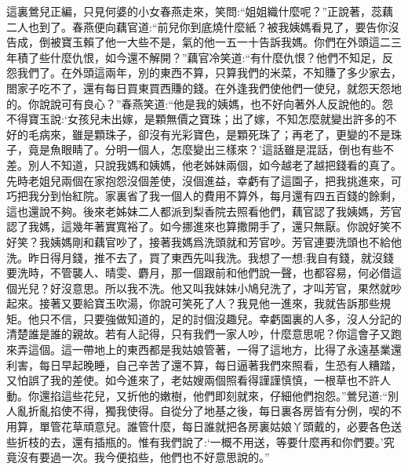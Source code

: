 \begin{parag}
    這裏鶯兒正編，只見何婆的小女春燕走來，笑問:“姐姐織什麼呢？”正說著，蕊藕二人也到了。春燕便向藕官道:“前兒你到底燒什麼紙？被我姨媽看見了，要告你沒告成，倒被寶玉賴了他一大些不是，氣的他一五一十告訴我媽。你們在外頭這二三年積了些什麼仇恨，如今還不解開？”藕官冷笑道:“有什麼仇恨？他們不知足，反怨我們了。在外頭這兩年，別的東西不算，只算我們的米菜，不知賺了多少家去，閤家子吃不了，還有每日買東買西賺的錢。在外逢我們使他們一使兒，就怨天怨地的。你說說可有良心？”春燕笑道:“他是我的姨媽，也不好向著外人反說他的。怨不得寶玉說:‘女孩兒未出嫁，是顆無價之寶珠；出了嫁，不知怎麼就變出許多的不好的毛病來，雖是顆珠子，卻沒有光彩寶色，是顆死珠了；再老了，更變的不是珠子，竟是魚眼睛了。分明一個人，怎麼變出三樣來？’這話雖是混話，倒也有些不差。別人不知道，只說我媽和姨媽，他老姊妹兩個，如今越老了越把錢看的真了。先時老姐兒兩個在家抱怨沒個差使，沒個進益，幸虧有了這園子，把我挑進來，可巧把我分到怡紅院。家裏省了我一個人的費用不算外，每月還有四五百錢的餘剩，這也還說不夠。後來老姊妹二人都派到梨香院去照看他們，藕官認了我姨媽，芳官認了我媽，這幾年著實寬裕了。如今挪進來也算撒開手了，還只無厭。你說好笑不好笑？我姨媽剛和藕官吵了，接著我媽爲洗頭就和芳官吵。芳官連要洗頭也不給他洗。昨日得月錢，推不去了，買了東西先叫我洗。我想了一想:我自有錢，就沒錢要洗時，不管襲人、晴雯、麝月，那一個跟前和他們說一聲，也都容易，何必借這個光兒？好沒意思。所以我不洗。他又叫我妹妹小鳩兒洗了，才叫芳官，果然就吵起來。接著又要給寶玉吹湯，你說可笑死了人？我見他一進來，我就告訴那些規矩。他只不信，只要強做知道的，足的討個沒趣兒。幸虧園裏的人多，沒人分記的清楚誰是誰的親故。若有人記得，只有我們一家人吵，什麼意思呢？你這會子又跑來弄這個。這一帶地上的東西都是我姑娘管著，一得了這地方，比得了永遠基業還利害，每日早起晚睡，自己辛苦了還不算，每日逼著我們來照看，生恐有人糟踏，又怕誤了我的差使。如今進來了，老姑嫂兩個照看得謹謹慎慎，一根草也不許人動。你還掐這些花兒，又折他的嫩樹，他們即刻就來，仔細他們抱怨。”鶯兒道:“別人亂折亂掐使不得，獨我使得。自從分了地基之後，每日裏各房皆有分例，喫的不用算，單管花草頑意兒。誰管什麼，每日誰就把各房裏姑娘丫頭戴的，必要各色送些折枝的去，還有插瓶的。惟有我們說了:‘一概不用送，等要什麼再和你們要。’究竟沒有要過一次。我今便掐些，他們也不好意思說的。”
\end{parag}


